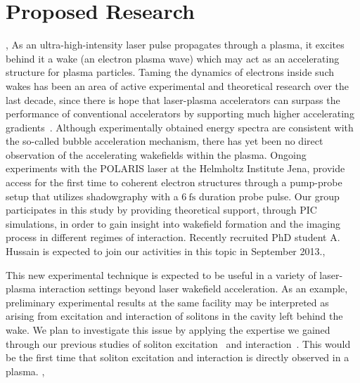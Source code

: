 \documentclass[11pt,a4paper,final]{moderncv}
\begin{document}
\section{Proposed Research}
\sep
{}
As an ultra-high-intensity laser pulse propagates through a plasma, it excites behind it a wake (an electron plasma wave) 
which may act as an accelerating structure for plasma particles. Taming the dynamics of electrons inside such wakes 
has been an area of active experimental and theoretical research over 
the last decade, since there is hope that laser-plasma accelerators can surpass the performance of 
conventional accelerators by supporting 
much higher accelerating gradients~\cite{mangles04,geddes04,faure04,esarey09}. Although experimentally obtained 
energy spectra are consistent 
with the so-called bubble acceleration mechanism,
there has yet been no direct observation of the accelerating wakefields within the plasma. 
Ongoing experiments with the POLARIS laser at the
Helmholtz Institute Jena, provide access for the first time to coherent electron structures 
through a pump-probe setup that utilizes shadow\-graphy 
with a $6~\mathrm{fs}$ duration probe pulse. Our group participates in this study by providing 
theoretical support, through PIC simulations, in order to
gain insight into wakefield formation and the imaging process in different regimes of interaction. 
Recently recruited PhD student A. Hussain is expected to join our activities in this topic in September 2013.\sep

This new experimental technique is expected to be useful in a variety of 
laser-plasma interaction settings beyond laser wakefield acceleration. 
As an example, preliminary experimental results at the same facility may be interpreted as
arising from excitation and interaction of solitons in the cavity left behind the wake. 
We plan to investigate this issue by applying the expertise we gained through
our previous studies of soliton excitation~\cite{SSL10,SSL10-1} 
and interaction~\cite{saxena2013}. 
This would be the first time that soliton excitation and 
interaction is directly observed in a plasma. 
\sep
\end{document}
